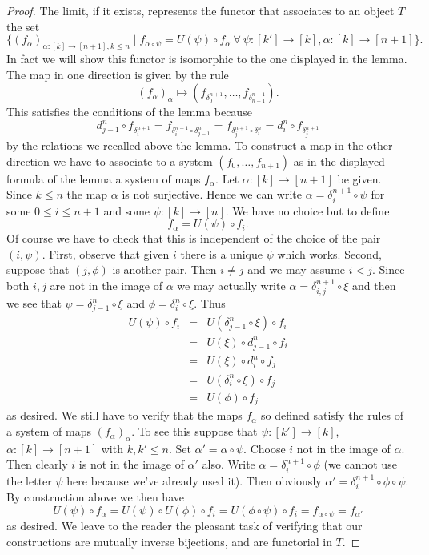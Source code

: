 \begin{proof}
The limit, if it exists, represents the functor
that associates to an object $T$ the set
$$
\{
(f_\alpha)_{\alpha : [k] \to [n + 1], k \leq n}
\mid
f_{\alpha \circ \psi} = U(\psi) \circ f_\alpha\ \forall
\ \psi : [k'] \to [k], \alpha : [k] \to [n + 1]
\}.
$$
In fact we will show this functor is isomorphic to the
one displayed in the lemma. The map in one direction
is given by the rule
$$
(f_\alpha)_{\alpha}
\longmapsto
(f_{\delta^{n + 1}_0}, \ldots, f_{\delta^{n + 1}_{n + 1}}).
$$
This satisfies the conditions of the lemma because
$$
d^n_{j - 1} \circ f_{\delta^{n + 1}_i} =
f_{\delta^{n + 1}_i \circ \delta^n_{j - 1}} =
f_{\delta^{n + 1}_j \circ \delta^n_i} =
d^n_i \circ f_{\delta^{n + 1}_j}
$$
by the relations we recalled above the lemma. To construct a map
in the other direction we have to associate to a system
$(f_0, \ldots, f_{n + 1})$ as in the displayed formula
of the lemma a system of maps $f_\alpha$. Let $\alpha : [k] \to [n + 1]$
be given. Since $k \leq n$ the map $\alpha$ is not surjective.
Hence we can write $\alpha = \delta^{n + 1}_i \circ \psi$
for some $0 \leq i \leq n + 1$ and some
$\psi : [k] \to [n]$. We have no choice but to define
$$
f_\alpha = U(\psi) \circ f_i.
$$
Of course we have to check that this is independent of the
choice of the pair $(i, \psi)$. First, observe that given $i$
there is a unique $\psi$ which works. Second, suppose that $(j, \phi)$ is
another pair. Then $i \not = j$ and we may assume $i < j$. Since
both $i, j$ are not in the image of $\alpha$ we may actually
write $\alpha = \delta^{n + 1}_{i, j} \circ \xi$ and then
we see that $\psi = \delta^n_{j - 1} \circ \xi$ and
$\phi = \delta^n_i \circ \xi$. Thus
\begin{eqnarray*}
U(\psi) \circ f_i & = & U(\delta^n_{j - 1} \circ \xi) \circ f_i \\
& = & U(\xi) \circ d^n_{j - 1} \circ f_i \\
& = & U(\xi) \circ d^n_i \circ f_j \\
& = & U(\delta^n_i \circ \xi) \circ f_j \\
& = & U(\phi) \circ f_j
\end{eqnarray*}
as desired. We still have to verify that the maps
$f_\alpha$ so defined satisfy the rules of a system
of maps $(f_\alpha)_\alpha$. To see this suppose that
$\psi : [k'] \to [k]$, $\alpha : [k] \to [n + 1]$ with
$k, k' \leq n$. Set $\alpha' = \alpha \circ \psi$.
Choose $i$ not in the image of $\alpha$. Then clearly
$i$ is not in the image of $\alpha'$ also. Write
$\alpha = \delta^{n + 1}_i \circ \phi$ (we cannot use the letter $\psi$ here
because we've already used it). Then obviously
$\alpha' = \delta^{n + 1}_i \circ \phi \circ \psi$. By construction above
we then have
$$
U(\psi) \circ f_\alpha = U(\psi) \circ U(\phi) \circ f_i
= U(\phi \circ \psi) \circ f_i = f_{\alpha \circ \psi} = f_{\alpha'}
$$
as desired. We leave to the reader the pleasant task of verifying
that our constructions are mutually inverse bijections, and are
functorial in $T$.
\end{proof}

